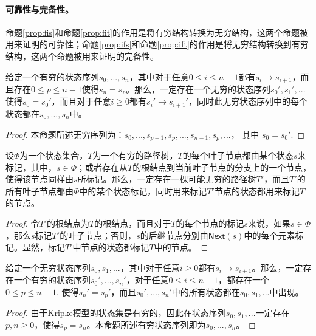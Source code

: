 \paragraph{可靠性与完备性。}\label{sound:complete}
命题\ref{prop:fis}和命题\ref{prop:fit}的作用是将有穷结构转换为无穷结构，这两个命题被用来证明\SCTL{}的可靠性；命题\ref{prop:ifs}和命题\ref{prop:ift}的作用是将无穷结构转换到有穷结构，这两个命题被用来证明\SCTL{}的完备性。

\begin{proposition} [有穷状态序列到无穷状态序列]\label{prop:fis}
	给定一个有穷的状态序列$s_0,...,s_n$，其中对于任意$0\le i\le n-1$都有$s_i\longrightarrow s_{i+1}$，而且存在$0\le p \le n-1$使得$s_n=s_p$。那么，一定存在一个无穷的状态序列$s_0',s_1',...$使得$s_0 = s_0'$，而且对于任意$i\ge 0$都有$s_i'\longrightarrow
	s_{i+1}'$，同时此无穷状态序列中的每个状态都在$s_0,...,s_n$中。
\end{proposition}
\begin{proof}
	本命题所述无穷序列为：$s_0,...,s_{p-1},s_p,...,s_{n-1},s_p,...$， 其中 $s_0 = s_0'$.
\end{proof}

\begin{proposition}[有穷路径树到无穷路径树]\label{prop:fit}
	设$\Phi$为一个状态集合，$T$为一个有穷的路径树，$T$的每个叶子节点都由某个状态$s$来标记，其中，$s\in \Phi$；或者存在从$T$的根结点到当前叶子节点的分支上的一个节点，使得该节点同样由$s$所标记。那么，一定存在一棵可能无穷的路径树$T'$，而且$T'$的所有叶子节点都由$\Phi$中的某个状态标记，同时用来标记$T'$节点的状态都用来标记$T$的节点。
\end{proposition}
\begin{proof}
	令$T'$的根结点为$T$的根结点，而且对于$T$的每个节点的标记$s$来说，如果$s\in\Phi$，那么$s$标记$T'$的叶子节点；否则，$s$的后继节点分别由$\mathsf{Next}(s)$中的每个元素标记。显然，标记$T'$中节点的状态都标记$T$中的节点。
\end{proof}


\begin{proposition} [无穷状态序列到有穷状态序列]\label{prop:ifs}
	给定一个无穷状态序列$s_0,s_1,...$，其中对于任意$i\ge 0$都有$s_i\longrightarrow s_{i+1}$。那么，一定存在一个有穷的状态序列$s_0',...,s_n'$，对于任意$0\le i\le n-1$，都存在一个$0\le p\le n-1$, 使得$s_n'=s_p'$，而且$s_0',...,s_n'$中的所有状态都在$s_0,s_1,...$中出现。
\end{proposition}
\begin{proof}
	由于Kripke模型的状态集是有穷的，因此在状态序列$s_0,s_1,...$一定存在$p, n\ge 0$，使得$s_p=s_n$。本命题所述有穷状态序列即为$s_0,...,s_n$。
\end{proof}

